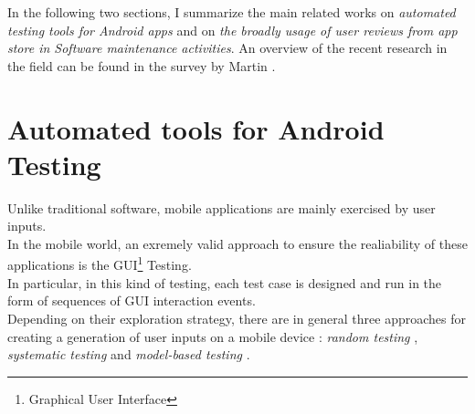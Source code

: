 In the following two sections, I summarize the main related works on \textit{automated testing tools for Android apps} and on \textit{the broadly usage of user reviews from app store in Software maintenance activities}. 
An overview of the recent research in the field can be found in the survey by Martin \etal \cite{Martin:tse2017}. 
\section{Automated tools for Android Testing}

Unlike traditional software, mobile applications are mainly exercised by user inputs. \\ 
In the mobile world, an exremely valid approach to ensure the realiability of these applications is the GUI\footnote{Graphical User Interface} Testing. \\ 
In particular, in this kind of testing, each test case is designed and run in the form of sequences of GUI interaction events.  \\
Depending on their exploration strategy, there are in general three approaches for creating a generation of user inputs on a mobile device \cite{dynodroid, areWeThereYet}: \textit{random testing} \cite{dynodroid, monkey}, \textit{systematic testing} \cite{evodroid} and \textit{model-based testing} \cite{mobiguitar, guidedgui, mining}. 
